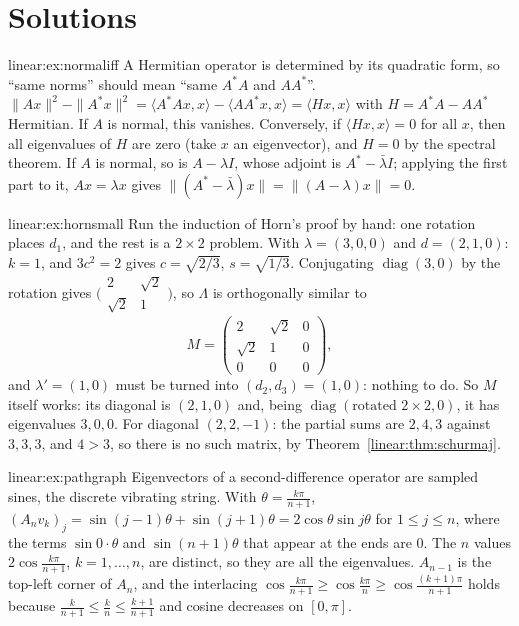 \section{Solutions}

\begin{solution}{linear:ex:normaliff}
\idea A Hermitian operator is determined by its quadratic form, so ``same norms'' should mean ``same $A^*A$ and $AA^*$''.
\writeup $\|Ax\|^2-\|A^*x\|^2=\langle A^*Ax,x\rangle-\langle AA^*x,x\rangle=\langle Hx,x\rangle$ with $H=A^*A-AA^*$ Hermitian.
If $A$ is normal, this vanishes. Conversely, if $\langle Hx,x\rangle=0$ for all $x$, then all eigenvalues of $H$ are zero
(take $x$ an eigenvector), and $H=0$ by the spectral theorem. If $A$ is normal, so is $A-\lambda I$, whose adjoint is
$A^*-\bar\lambda I$; applying the first part to it, $Ax=\lambda x$ gives $\|(A^*-\bar\lambda)x\|=\|(A-\lambda)x\|=0$.
\end{solution}

\begin{solution}{linear:ex:hornsmall}
\idea Run the induction of Horn's proof by hand: one rotation places $d_1$, and the rest is a $2\times2$ problem.
\writeup With $\lambda=(3,0,0)$ and $d=(2,1,0)$: $k=1$, and $3c^2=2$ gives $c=\sqrt{2/3}$, $s=\sqrt{1/3}$. Conjugating
$\operatorname{diag}(3,0)$ by the rotation gives $\bigl(\begin{smallmatrix}2&\sqrt2\\\sqrt2&1\end{smallmatrix}\bigr)$, so
$\Lambda$ is orthogonally similar to
\[
M=\begin{pmatrix}2&\sqrt2&0\\\sqrt2&1&0\\0&0&0\end{pmatrix},
\]
and $\lambda'=(1,0)$ must be turned into $(d_2,d_3)=(1,0)$: nothing to do. So $M$ itself works: its diagonal is $(2,1,0)$
and, being $\operatorname{diag}(\text{rotated }2\times2,0)$, it has eigenvalues $3,0,0$. For diagonal $(2,2,-1)$: the
partial sums are $2,4,3$ against $3,3,3$, and $4>3$, so there is no such matrix, by Theorem~\ref{linear:thm:schurmaj}.
\end{solution}

\begin{solution}{linear:ex:pathgraph}
\idea Eigenvectors of a second-difference operator are sampled sines, the discrete vibrating string.
\writeup With $\theta=\frac{k\pi}{n+1}$, $(A_nv_k)_j=\sin(j-1)\theta+\sin(j+1)\theta=2\cos\theta\sin j\theta$ for $1\le j\le n$,
where the terms $\sin0\cdot\theta$ and $\sin(n+1)\theta$ that appear at the ends are $0$. The $n$ values $2\cos\frac{k\pi}
{n+1}$, $k=1,\dots,n$, are distinct, so they are all the eigenvalues. $A_{n-1}$ is the top-left corner of $A_n$, and the
interlacing $\cos\frac{k\pi}{n+1}\ge\cos\frac{k\pi}n\ge\cos\frac{(k+1)\pi}{n+1}$ holds because $\frac k{n+1}\le\frac kn\le
\frac{k+1}{n+1}$ and cosine decreases on $[0,\pi]$.
\end{solution}

